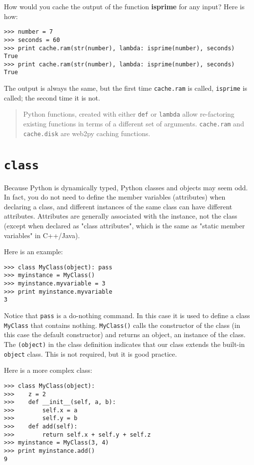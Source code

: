 \documentclass[justified,sixbynine,notoc]{tufte-book}
\def\ft{\small\tt}
\def\inxx#1{\index{#1}}
\begin{document}
\begin{fullwidth}
How would you cache the output of the function {\bf isprime} for any input?
Here is how:
\begin{lstlisting}
>>> number = 7
>>> seconds = 60
>>> print cache.ram(str(number), lambda: isprime(number), seconds)
True
>>> print cache.ram(str(number), lambda: isprime(number), seconds)
True
\end{lstlisting}

The output is always the same, but the first time {\ft cache.ram} is called, {\ft isprime} is called; the second time it is not.

\begin{quote}Python functions, created with either {\ft def} or {\ft lambda} allow re-factoring existing functions in terms of a different set of arguments.
{\ft cache.ram} and {\ft cache.disk} are web2py caching functions.\end{quote}
\goodbreak\section{{\ft class}}

\inxx{class}

Because Python is dynamically typed, Python classes and objects may seem odd. In fact, you do not need to define the member variables (attributes) when declaring a class, and different instances of the same class can have different attributes. Attributes are generally associated with the instance, not the class (except when declared as "class attributes", which is the same as "static member variables" in C++/Java).

Here is an example:
\begin{lstlisting}
>>> class MyClass(object): pass
>>> myinstance = MyClass()
>>> myinstance.myvariable = 3
>>> print myinstance.myvariable
3
\end{lstlisting}

Notice that {\ft pass} is a do-nothing command. In this case it is used to define a class {\ft MyClass} that contains nothing. {\ft MyClass()} calls the constructor of the class (in this case the default constructor) and returns an object, an instance of the class. The {\ft (object)} in the class definition indicates that our class extends the built-in {\ft object} class. This is not required, but it is good practice.

Here is a more complex class:
\begin{lstlisting}
>>> class MyClass(object):
>>>    z = 2
>>>    def __init__(self, a, b):
>>>        self.x = a
>>>        self.y = b
>>>    def add(self):
>>>        return self.x + self.y + self.z
>>> myinstance = MyClass(3, 4)
>>> print myinstance.add()
9
\end{lstlisting}


\end{fullwidth}
\end{document}
